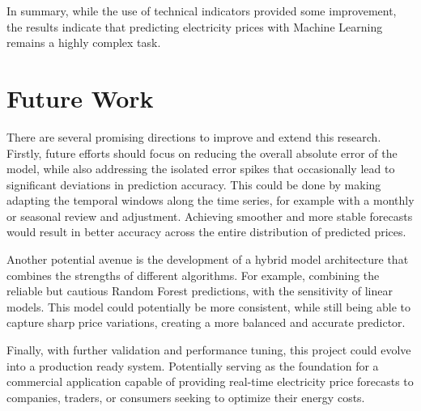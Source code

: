 \documentclass[12pt]{report} %
\begin{document}
In summary, while the use of technical indicators provided some improvement, the results indicate that predicting electricity prices with Machine Learning remains a highly complex task.

\section{Future Work}


There are several promising directions to improve and extend this research. Firstly, future efforts should focus on reducing the overall absolute error of the model, while also addressing the isolated error spikes that occasionally lead to significant deviations in prediction accuracy. This could be done by making adapting the temporal windows along the time series, for example with a monthly or seasonal review and adjustment. Achieving smoother and more stable forecasts would result in better accuracy across the entire distribution of predicted prices.

Another potential avenue is the development of a hybrid model architecture that combines the strengths of different algorithms. For example, combining the reliable but cautious Random Forest predictions, with the sensitivity of linear models. This model could potentially be more consistent, while still being able to capture sharp price variations, creating a more balanced and accurate predictor.

Finally, with further validation and performance tuning, this project could evolve into a production ready system. Potentially serving as the foundation for a commercial application capable of providing real-time electricity price forecasts to companies, traders, or consumers seeking to optimize their energy costs.



\clearpage
{}

\printbibliography
\end{document}
